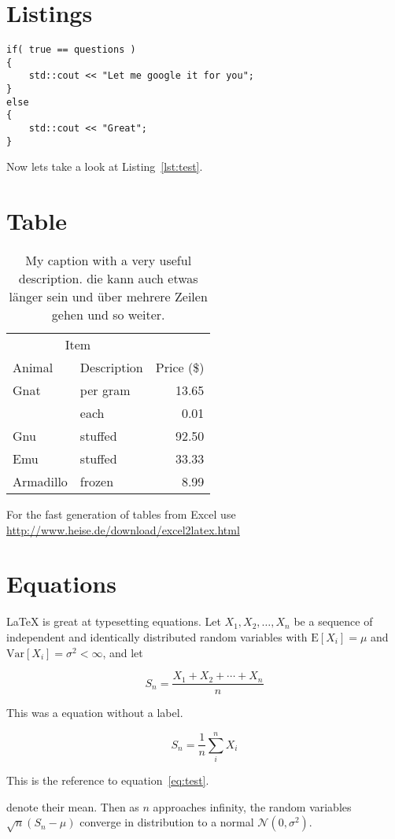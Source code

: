 \section{Listings}
\begin{lstlisting}[caption=A bit of source code., label=lst:test]
if( true == questions )
{
    std::cout << "Let me google it for you";
}
else
{
    std::cout << "Great";
}
\end{lstlisting}

Now lets take a look at Listing~\ref{lst:test}.


\section{Table}

\begin{table}[ht!]
  \caption{My caption with a very useful description. die kann auch etwas länger sein und über mehrere Zeilen gehen und so weiter.}
  \label{my-label}
  \begin{tabular}{llr}
    \hline
    \multicolumn{2}{c}{Item} &            \\ \cline{1-2}
    Animal     & Description & Price (\$) \\ \hline
    Gnat       & per gram    & 13.65      \\
               & each        & 0.01       \\
    Gnu        & stuffed     & 92.50      \\
    Emu        & stuffed     & 33.33      \\
    Armadillo  & frozen      & 8.99       \\ \hline
  \end{tabular}
\end{table}

For the fast generation of tables from Excel use \url{http://www.heise.de/download/excel2latex.html}

\section{Equations}

\LaTeX{} is great at typesetting equations. Let $X_1, X_2, \ldots, X_n$ be a sequence of independent and identically distributed random variables with $\text{E}[X_i] = \mu$ and $\text{Var}[X_i] = \sigma^2 < \infty$, and let

$$S_n = \frac{X_1 + X_2 + \cdots + X_n}{n}$$

This was a equation without a label.
      
\begin{equation}
S_n = \frac{1}{n}\sum_{i}^{n} X_i
\label{eq:test}
\end{equation}

This is the reference to equation~\ref{eq:test}.      

denote their mean. Then as $n$ approaches infinity, the random variables $\sqrt{n}(S_n - \mu)$ converge in distribution to a normal $\mathcal{N}(0, \sigma^2)$.


